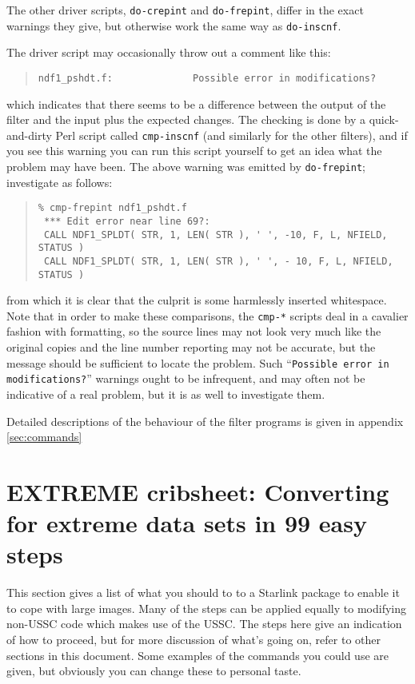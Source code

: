 \documentclass[twoside,11pt]{article}
\newcommand{\htmlref}[2]{#1}
\renewcommand{\_}{\texttt{\symbol{95}}}
\newcommand{\xdofilter}[1]{\htmlref{{\tt do-#1}}{do-xxx}}
\newcommand{\file}[1]{{\tt #1}}
\newcommand{\dofilter}[1]{{\tt do-#1}}
\newenvironment{squote}{\begin{quote}\begin{small}}{\end{small}\end{quote}}
\begin{document}
The other driver scripts, \dofilter{crepint} and \dofilter{frepint},
differ in the exact warnings they give, but otherwise work the
same way as \dofilter{inscnf}.

The driver script may occasionally throw out a comment like this:
\begin{squote}
\begin{verbatim}
ndf1_pshdt.f:              Possible error in modifications?          
\end{verbatim}
\end{squote}
which indicates that there seems to be a difference between
the output of the filter and the input plus the expected changes.
The checking is done by a quick-and-dirty Perl script called
\file{cmp-inscnf} (and similarly for the other filters),
and if you see this warning you can run this script yourself
to get an idea what the problem may have been. 
The above warning was emitted by \xdofilter{frepint}; investigate 
as follows:
\begin{squote}
\begin{verbatim}
% cmp-frepint ndf1_pshdt.f
 *** Edit error near line 69?:
 CALL NDF1_SPLDT( STR, 1, LEN( STR ), ' ', -10, F, L, NFIELD, STATUS )
 CALL NDF1_SPLDT( STR, 1, LEN( STR ), ' ', - 10, F, L, NFIELD, STATUS )
\end{verbatim}
\end{squote}
from which it is clear that the culprit is some harmlessly inserted
whitespace.
Note that in order to make these comparisons, the \file{cmp-*} scripts
deal in a cavalier fashion with formatting, so the source
lines may not look very much like the original copies and the line number
reporting may not be accurate, but the message
should be sufficient to locate the problem.
Such ``{\tt Possible error in modifications?}'' 
warnings ought to be infrequent, and may often not be indicative
of a real problem, but it is as well to investigate them.

Detailed descriptions of the behaviour of the filter programs is
given in appendix \ref{sec:commands}


\section{EXTREME cribsheet: Converting for extreme data sets in 99 easy 
                            steps\label{sec:cribsheet}}

This section gives a list of what you should to to
a Starlink package to enable it to cope with large images.
Many of the steps can be applied equally 
to modifying non-USSC code which makes use of the USSC.
The steps here give an indication of how to proceed, 
but for more discussion of what's going on, refer to other sections
in this document.
Some examples of the commands you could use are given, 
but obviously you can change these to personal taste.
\end{document}
